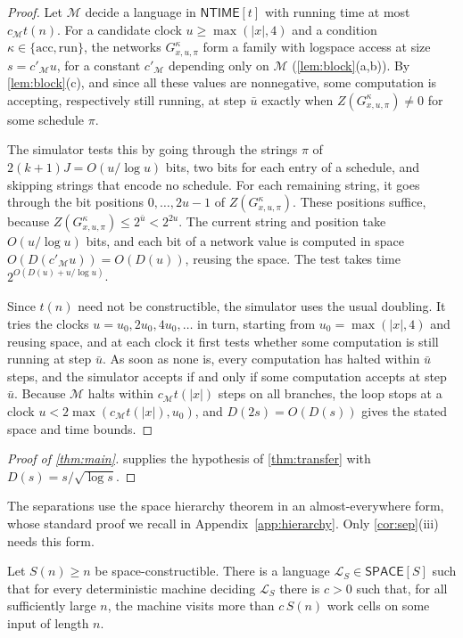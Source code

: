 \documentclass[11pt]{article}
\theoremstyle{definition}
\theoremstyle{definition}
\theoremstyle{remark}
\newcommand{\NTIME}{\mathsf{NTIME}}
\newcommand{\SPACE}{\mathsf{SPACE}}
\newcommand{\acc}{\mathrm{acc}}
\newcommand{\run}{\mathrm{run}}
\begin{document}
\begin{proof}
Let $\mathcal M$ decide a language in $\NTIME[t]$ with running time at most $c_{\mathcal M}t(n)$. For a candidate clock $u\ge\max(|x|,4)$ and a condition $\kappa\in\{\acc,\run\}$, the networks $G^\kappa_{x,u,\pi}$ form a family with logspace access at size $s=c'_{\mathcal M}u$, for a constant $c'_{\mathcal M}$ depending only on $\mathcal M$ (\cref{lem:block}(a,b)). By \cref{lem:block}(c), and since all these values are nonnegative, some computation is accepting, respectively still running, at step $\bar u$ exactly when $Z(G^\kappa_{x,u,\pi})\ne0$ for some schedule $\pi$.

The simulator tests this by going through the strings $\pi$ of $2(k+1)J=O(u/\log u)$ bits, two bits for each entry of a schedule, and skipping strings that encode no schedule. For each remaining string, it goes through the bit positions $0,\dots,2u-1$ of $Z(G^\kappa_{x,u,\pi})$. These positions suffice, because $Z(G^\kappa_{x,u,\pi})\le2^{\bar u}<2^{2u}$. The current string and position take $O(u/\log u)$ bits, and each bit of a network value is computed in space $O(D(c'_{\mathcal M}u))=O(D(u))$, reusing the space. The test takes time $2^{O(D(u)+u/\log u)}$.

Since $t(n)$ need not be constructible, the simulator uses the usual doubling. It tries the clocks $u=u_0,2u_0,4u_0,\dots$ in turn, starting from $u_0=\max(|x|,4)$ and reusing space, and at each clock it first tests whether some computation is still running at step $\bar u$. As soon as none is, every computation has halted within $\bar u$ steps, and the simulator accepts if and only if some computation accepts at step $\bar u$. Because $\mathcal M$ halts within $c_{\mathcal M}t(|x|)$ steps on all branches, the loop stops at a clock $u<2\max(c_{\mathcal M}t(|x|),u_0)$, and $D(2s)=O(D(s))$ gives the stated space and time bounds.
\end{proof}

\begin{proof}[Proof of \cref{thm:main}]
 supplies the hypothesis of \cref{thm:transfer} with $D(s)=s/\sqrt{\log s}$.
\end{proof}

The separations use the space hierarchy theorem in an almost-everywhere form, whose standard proof we recall in Appendix~\ref{app:hierarchy}. Only \cref{cor:sep}(iii) needs this form.

\begin{lemma}\label{lem:hierarchy}
Let $S(n)\ge n$ be space-constructible. There is a language $\mathcal L_S\in\SPACE[S]$ such that for every deterministic machine deciding $\mathcal L_S$ there is $c>0$ such that, for all sufficiently large $n$, the machine visits more than $c\,S(n)$ work cells on some input of length $n$.
\end{lemma}
\end{document}
